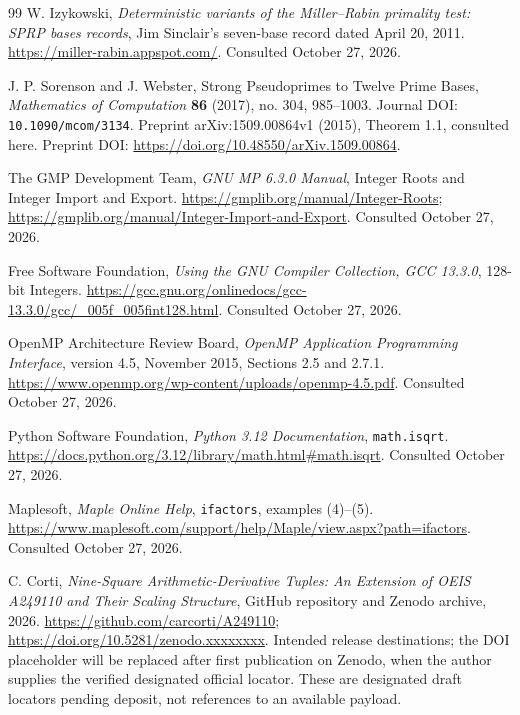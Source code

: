 \documentclass[11pt]{article}
\theoremstyle{definition}
\theoremstyle{remark}
\begin{document}
\begin{thebibliography}{99}
W. Izykowski, \emph{Deterministic variants of the Miller--Rabin
primality test: SPRP bases records}, Jim Sinclair's seven-base
record dated April 20, 2011.
\url{https://miller-rabin.appspot.com/}. Consulted October 27, 2026.

J. P. Sorenson and J. Webster, Strong Pseudoprimes to Twelve Prime
Bases, \emph{Mathematics of Computation} \textbf{86} (2017),
no. 304, 985--1003. Journal DOI: \texttt{10.1090/mcom/3134}.
Preprint arXiv:1509.00864v1 (2015),
Theorem 1.1, consulted here.
Preprint DOI: \url{https://doi.org/10.48550/arXiv.1509.00864}.

The GMP Development Team, \emph{GNU MP 6.3.0 Manual},
Integer Roots and Integer Import and Export.
\url{https://gmplib.org/manual/Integer-Roots};
\url{https://gmplib.org/manual/Integer-Import-and-Export}.
Consulted October 27, 2026.

Free Software Foundation, \emph{Using the GNU Compiler Collection,
GCC 13.3.0}, 128-bit Integers.
\url{https://gcc.gnu.org/onlinedocs/gcc-13.3.0/gcc/_005f_005fint128.html}.
Consulted October 27, 2026.

OpenMP Architecture Review Board, \emph{OpenMP Application
Programming Interface}, version 4.5, November 2015, Sections 2.5
and 2.7.1. \url{https://www.openmp.org/wp-content/uploads/openmp-4.5.pdf}.
Consulted October 27, 2026.

Python Software Foundation, \emph{Python 3.12 Documentation},
\texttt{math.isqrt}.
\url{https://docs.python.org/3.12/library/math.html\#math.isqrt}.
Consulted October 27, 2026.

Maplesoft, \emph{Maple Online Help}, \texttt{ifactors},
examples (4)--(5).
\url{https://www.maplesoft.com/support/help/Maple/view.aspx?path=ifactors}.
Consulted October 27, 2026.

C. Corti, \emph{Nine-Square Arithmetic-Derivative Tuples: An
Extension of OEIS A249110 and Their Scaling Structure},
GitHub repository and Zenodo archive, 2026.
\url{https://github.com/carcorti/A249110};
\url{https://doi.org/10.5281/zenodo.xxxxxxxx}.
Intended release destinations; the DOI placeholder will be replaced
after first publication on Zenodo, when the author supplies the
verified designated official locator. These are designated draft
locators pending deposit, not references to an available payload.

\end{thebibliography}
\end{document}
